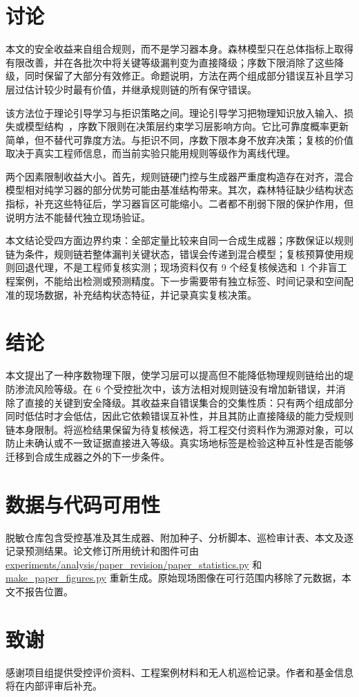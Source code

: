 \documentclass[10pt,twocolumn,a4paper]{ctexart}
\begin{document}
\section{讨论}
本文的安全收益来自组合规则，而不是学习器本身。森林模型只在总体指标上取得有限改善，并在各批次中将关键等级漏判变为直接降级；序数下限消除了这些降级，同时保留了大部分有效修正。命题说明，方法在两个组成部分错误互补且学习层过估计较少时最有价值，并继承规则链的所有保守错误。

该方法位于理论引导学习与拒识策略之间。理论引导学习把物理知识放入输入、损失或模型结构~\cite{Karpatne2017}，序数下限则在决策层约束学习层影响方向。它比可靠度概率更新简单，但不替代可靠度方法。与拒识不同，序数下限本身不放弃决策；复核的价值取决于真实工程师信息，而当前实验只能用规则等级作为离线代理。

两个因素限制收益大小。首先，规则链硬门控与生成器严重度构造存在对齐，混合模型相对纯学习器的部分优势可能由基准结构带来。其次，森林特征缺少结构状态指标，补充这些特征后，学习器盲区可能缩小。二者都不削弱下限的保护作用，但说明方法不能替代独立现场验证。

本文结论受四方面边界约束：全部定量比较来自同一合成生成器；序数保证以规则链为条件，规则链若整体漏判关键状态，错误会传递到混合模型；复核预算使用规则回退代理，不是工程师复核实测；现场资料仅有 9 个经复核候选和 1 个非盲工程案例，不能给出检测或预测精度。下一步需要带有独立标签、时间记录和空间配准的现场数据，补充结构状态特征，并记录真实复核决策。

\section{结论}
本文提出了一种序数物理下限，使学习层可以提高但不能降低物理规则链给出的堤防渗流风险等级。在 6 个受控批次中，该方法相对规则链没有增加新错误，并消除了直接的关键到安全降级。其收益来自错误集合的交集性质：只有两个组成部分同时低估时才会低估，因此它依赖错误互补性，并且其防止直接降级的能力受规则链本身限制。将巡检结果保留为待复核候选，将工程交付资料作为溯源对象，可以防止未确认或不一致证据直接进入等级。真实场地标签是检验这种互补性是否能够迁移到合成生成器之外的下一步条件。

\section*{数据与代码可用性}
脱敏仓库包含受控基准及其生成器、附加种子、分析脚本、巡检审计表、本文及逐记录预测结果。论文修订所用统计和图件可由 \url{experiments/analysis/paper_revision/paper_statistics.py} 和 \url{make_paper_figures.py} 重新生成。原始现场图像在可行范围内移除了元数据，本文不报告位置。

\section*{致谢}
感谢项目组提供受控评价资料、工程案例材料和无人机巡检记录。作者和基金信息将在内部评审后补充。

\balance


\end{document}
